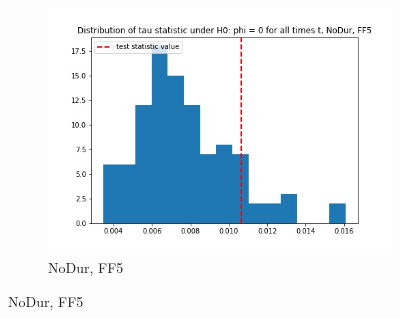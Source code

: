 \documentclass{article}
\begin{document}
\begin{figure}
\begin{subfigure}[b]{0.3\textwidth}
    \includegraphics[width=\textwidth]{NoDur/tau_hist_02_FF5.jpg}
    \caption{NoDur, FF5}
    \label{fig:1}
  \end{subfigure}
  \end{figure}
  
\end{document}
